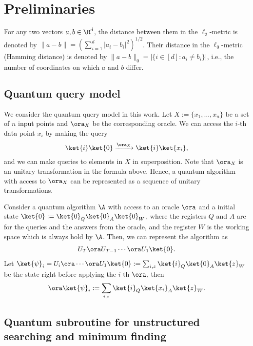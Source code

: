 \setcounter{section}{1}
\setcounter{theorem}{5}
\section{Preliminaries}
\begin{definition}
For any two vectors $a,b\in\R^d$, the distance between them in the $\ell_2$-metric is denoted by $\|a-b\|=\left(\sum_{i=1}^d|a_i-b_i|^2\right)^{1/2}$.
Their distance in the $\ell_0$-metric (Hamming distance) is denoted by 
$\|a-b\|_0=|\{i\in[d]:a_i\neq b_i\}|$, i.e.,
the number of coordinates on which $a$ and $b$ differ.
\end{definition}


\subsection{Quantum query model}

We consider the quantum query model in this work. Let $X:=\{x_1,\dots,x_n\}$ be a set of $n$ input points and $\ora_X$ be the corresponding oracle. We can access the $i$-th data point $x_i$ by making the query 
\begin{align}
    \ket{i}\ket{0} \xrightarrow{\ora_X} \ket{i}\ket{x_i},  
\end{align}
and we can make queries to elements in $X$ in superposition. Note that $\ora_X$ is an unitary transformation in the formula above. Hence, a quantum algorithm with access to $\ora_X$ can be represented as a sequence of unitary transformations. 

Consider a quantum algorithm $\A$ with access to an oracle $\ora$ and a initial state $\ket{0}:= \ket{0}_{Q}\ket{0}_{A}\ket{0}_W$, where the registers $Q$ and $A$ are for the queries and the answers from the oracle, and the register $W$ is the working space which is always hold by $\A$.  Then, we can represent the algorithm as 
\begin{align}
    U_T \ora U_{T-1}\cdots\ora U_1  \ket{0}. 
\end{align}
Let $\ket{\psi}_i= U_i\ora \cdots \ora U_1\ket{0}:= \sum_{i,z} \ket{i}_Q\ket{0}_A\ket{z}_W$ be the state right before applying the $i$-th $\ora$, then
\begin{align}
    \ora \ket{\psi}_i:= \sum_{i,z} \ket{i}_Q\ket{x_i}_A\ket{z}_W.
\end{align}
\subsection{Quantum subroutine for unstructured searching and minimum finding}


